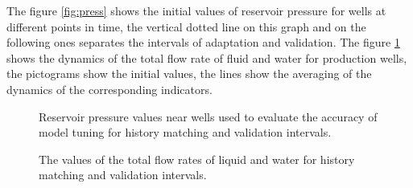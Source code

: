 \documentclass[
11pt,%
tightenlines,%
twoside,%
onecolumn,%
nofloats,%
nobibnotes,%
nofootinbib,%
superscriptaddress,%
noshowpacs,%
centertags]%
{revtex4}
\begin{document}
The figure \ref{fig:press} shows the initial values of reservoir pressure for wells at different points in time, the vertical dotted line on this graph and on the following ones separates the intervals of adaptation and validation. The figure \ref{fig:qlic} shows the dynamics of the total flow rate of fluid and water for production wells, the pictograms show the initial values, the lines show the averaging of the dynamics of the corresponding indicators.
\begin{figure} 
    \begin{minipage}[h]{0.48\linewidth}
      \caption{Reservoir pressure values near wells used to evaluate the accuracy of model tuning for history matching and validation intervals.}
      \label{fig:press}
    \end{minipage} \hfill
    \begin{minipage}[h]{0.48\linewidth}
      \caption{The values of the total flow rates of liquid and water for history matching and validation intervals.}
      \label{fig:qlic}
    \end{minipage} 
\end{figure}
\end{document}
